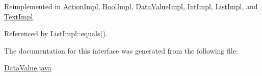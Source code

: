 Reimplemented in \hyperlink{classActionImpl_a21}{Action\-Impl}, \hyperlink{classBoolImpl_a2}{Bool\-Impl}, \hyperlink{classDataValueImpl_a5}{Data\-Value\-Impl}, \hyperlink{classIntImpl_a9}{Int\-Impl}, \hyperlink{classListImpl_a5}{List\-Impl}, and \hyperlink{classTextImpl_a1}{Text\-Impl}.

Referenced by List\-Impl::equals().



The documentation for this interface was generated from the following file:\begin{CompactItemize}
\item 
\hyperlink{DataValue_8java-source}{Data\-Value.java}\end{CompactItemize}
